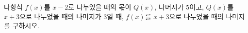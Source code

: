 다항식 $f(x)$를 $x-2$로 나누었을 때의 몫이 $Q(x)$, 나머지가 $5$이고, $Q(x)$를 $x+3$으로 나누었을 때의 나머지가 $3$일 때, $f(x)$를 $x+3$으로 나누었을 때의 나머지를 구하시오.
